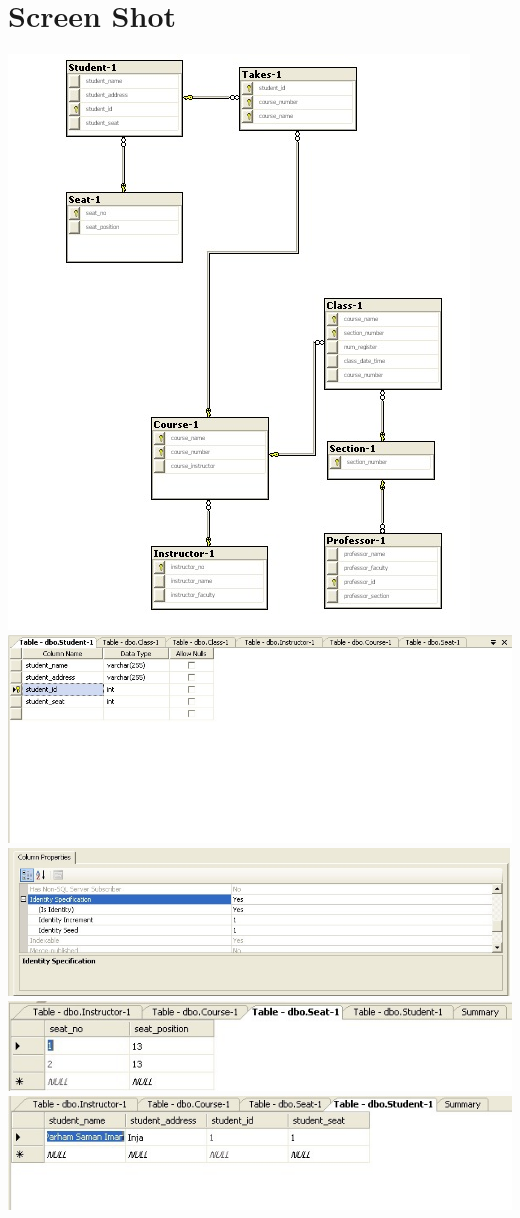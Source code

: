 \documentclass{article}
\begin{document}
\section{Screen Shot}
\includegraphics[scale=0.5]{figs/phase-1.jpg}\\
\includegraphics[scale=0.5]{figs/phase-3.jpg}\\
\includegraphics[scale=0.5]{figs/phase-4.jpg}\\
\includegraphics[scale=0.5]{figs/phase-5.jpg}\\
\includegraphics[scale=0.5]{figs/phase-6.jpg}\\
\end{document}

